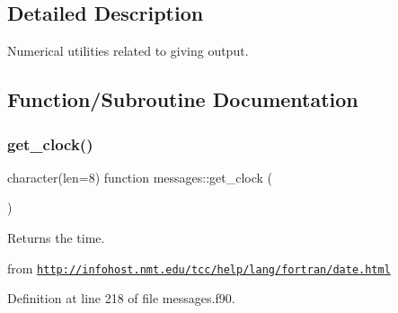 \subsection{Detailed Description}
Numerical utilities related to giving output. 

\subsection{Function/\+Subroutine Documentation}
\mbox{\label{namespacemessages_a61fd0b51b5e37d58fdc993c01792a3fd}} 
\subsubsection{\texorpdfstring{get\+\_\+clock()}{get\_clock()}}
{\footnotesize\ttfamily character(len=8) function messages\+::get\+\_\+clock (\begin{DoxyParamCaption}{ }\end{DoxyParamCaption})}



Returns the time. 

from \href{http://infohost.nmt.edu/tcc/help/lang/fortran/date.html}{\tt http\+://infohost.\+nmt.\+edu/tcc/help/lang/fortran/date.\+html} 

Definition at line 218 of file messages.\+f90.

